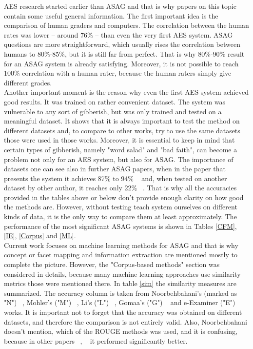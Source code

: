 AES research started earlier than ASAG and that is why papers on this topic contain some useful general information. The first important idea is the comparison of human graders and computers. The correlation between the human rates was lower -- around 76\% -- than even the very first AES system. ASAG questions are more straightforward, which usually rises the correlation between humans to 80\%-85\%, but it is still far from perfect. That is why 80\%-90\% result for an ASAG system is already satisfying. Moreover, it is not possible to reach 100\% correlation with a human rater, because the human raters simply give different grades.\\

Another important moment is the reason why even the first AES system achieved good results. It was trained on rather convenient dataset. The system was vulnerable to any sort of gibberish, but was only trained and tested on a meaningful dataset. It shows that it is always important to test the method on different datasets and, to compare to other works, try to use the same datasets those were used in those works. Moreover, it is essential to keep in mind that certain types of gibberish, namely "word salad" and "bad faith", can become a problem not only for an AES system, but also for ASAG. The importance of datasets one can see also in further ASAG papers, when in the paper that presents the system it achieves 87\% to 94\% ~\cite{c-rater} and, when tested on another dataset by other author, it reaches only 22\% ~\cite{Mohler}. That is why all the accuracies provided in the tables above or below don't provide enough clarity on how good the methods are. However, without testing teach system ourselves on different kinds of data, it is the only way to compare them at least approximately. The performance of the most significant ASAG systems is shown in Tables \ref{CFM}, \ref{IE}, \ref{Corpus} and \ref{ML}.\\

Current work focuses on machine learning methods for ASAG and that is why concept or facet mapping and information extraction are mentioned mostly to complete the picture. However, the "Corpus-based methods" section was considered in details, because many machine learning approaches use similarity metrics those were mentioned there. In table \ref{sim} the similarity measures are summarized. The accuracy column is taken from Noorbehbahani's (marked as "N") ~\cite{Noorbehbahani}, Mohler's ("M") ~\cite{Mohler}, Li's ("L") ~\cite{Li}, Gomaa's ("G") ~\cite{Gomaa} and e-Examiner ("E") ~\cite{e-examiner} works. It is important not to forget that the accuracy was obtained on different datasets, and therefore the comparison is not entirely valid. Also, Noorbehbahani doesn't mention, which of the ROUGE methods was used, and it is confusing, because in other papers ~\cite{e-examiner}, ~\cite{Madnani} it performed significantly better.\\

